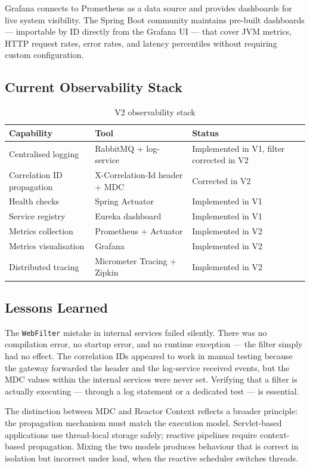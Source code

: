Grafana connects to Prometheus as a data source and provides dashboards for live system visibility. The Spring Boot community maintains pre-built dashboards --- importable by ID directly from the Grafana UI --- that cover JVM metrics, HTTP request rates, error rates, and latency percentiles without requiring custom configuration.

\subsection{Current Observability Stack}

\begin{table}[H]
\centering
\begin{tabular}{lll}
\toprule
\textbf{Capability} & \textbf{Tool} & \textbf{Status} \\
\midrule
Centralised logging & RabbitMQ + log-service & Implemented in V1, filter corrected in V2 \\
Correlation ID propagation & X-Correlation-Id header + MDC & Corrected in V2 \\
Health checks & Spring Actuator & Implemented in V1 \\
Service registry & Eureka dashboard & Implemented in V1 \\
Metrics collection & Prometheus + Actuator & Implemented in V2 \\
Metrics visualisation & Grafana & Implemented in V2 \\
Distributed tracing & Micrometer Tracing + Zipkin & Implemented in V2 \\
\bottomrule
\end{tabular}
\caption{V2 observability stack}
\end{table}

\subsection{Lessons Learned}

The \texttt{WebFilter} mistake in internal services failed silently. There was no compilation error, no startup error, and no runtime exception --- the filter simply had no effect. The correlation IDs appeared to work in manual testing because the gateway forwarded the header and the log-service received events, but the MDC values within the internal services were never set. Verifying that a filter is actually executing --- through a log statement or a dedicated test --- is essential.

The distinction between MDC and Reactor Context reflects a broader principle: the propagation mechanism must match the execution model. Servlet-based applications use thread-local storage safely; reactive pipelines require context-based propagation. Mixing the two models produces behaviour that is correct in isolation but incorrect under load, when the reactive scheduler switches threads.


